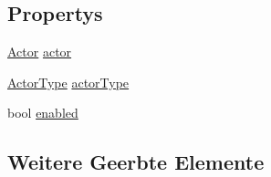 \subsection*{Propertys}
\begin{DoxyCompactItemize}
\item 
\hyperlink{class_gruppe22_1_1_backend_1_1_actor}{Actor} \hyperlink{class_gruppe22_1_1_backend_1_1_actor_tile_a77ed5b0b9c6dd777a4a6242d4f3b5447}{actor}
\item 
\hyperlink{namespace_gruppe22_1_1_backend_a56d8f7bd1b5ba29d421c27a959523af3}{Actor\-Type} \hyperlink{class_gruppe22_1_1_backend_1_1_actor_tile_ab30c224f38c2e55d44d2cf65fe659f35}{actor\-Type}
\item 
bool \hyperlink{class_gruppe22_1_1_backend_1_1_actor_tile_af8631f09f32bba5be31d3603b3df99c6}{enabled}
\end{DoxyCompactItemize}
\subsection*{Weitere Geerbte Elemente}


